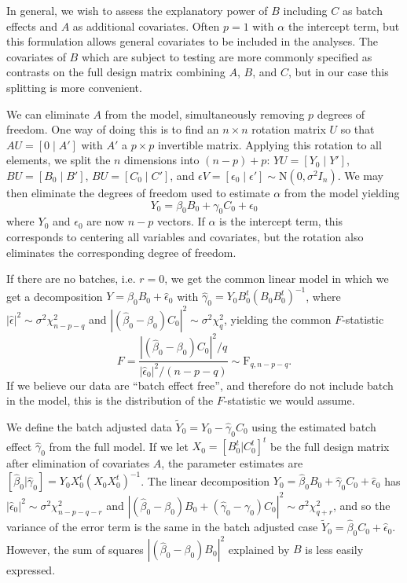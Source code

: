 \documentclass{bio}
\begin{document}
In general, we wish to assess the explanatory power of $B$ including $C$ as batch effects and $A$ as additional covariates. Often $p=1$ with $\alpha$ the intercept term, but this formulation allows general covariates to be included in the analyses. The covariates of $B$ which are subject to testing are more commonly specified as contrasts on the full design matrix combining $A$, $B$, and $C$, but in our case this splitting is more convenient.

We can eliminate $A$ from the model, simultaneously removing $p$ degrees of freedom. One way of doing this is to find an $n\times n$ rotation matrix $U$ so that $AU=[0\mid A']$ with $A'$ a $p\times p$ invertible matrix. Applying this rotation to all elements, we split the $n$ dimensions into $(n-p)+p$:  $YU=[Y_0\mid Y']$, $BU=[B_0\mid B']$, $BU=[C_0\mid C']$, and $\epsilon V=[\epsilon_0\mid\epsilon']\sim\text{N}(0,\sigma^2 I_n)$. We may then eliminate the degrees of freedom used to estimate $\alpha$ from the model yielding
\begin{equation}
Y_0=\beta_0 B_0+\gamma_0 C_0+\epsilon_0
\end{equation}
where $Y_0$ and $\epsilon_0$ are now $n-p$ vectors. If $\alpha$ is the intercept term, this corresponds to centering all variables and covariates, but the rotation also eliminates the corresponding degree of freedom.

If there are no batches, i.e. $r=0$, we get the common linear model in which we get a decomposition $Y=\hat\beta_0B_0+\hat\epsilon_0$ with $\hat\gamma_0=Y_0B_0^t(B_0B_0^t)^{-1}$, where
$|\hat\epsilon|^2\sim\sigma^2\chi^2_{n-p-q}$ and $|(\hat\beta_0-\beta_0)C_0|^2\sim\sigma^2\chi^2_q$, yielding the common
$F$-statistic
\begin{equation}
F=\frac{|(\hat\beta_0-\beta_0)C_0|^2/q}{|\hat\epsilon_0|^2/(n-p-q)}\sim\text{F}_{q,n-p-q}.
\end{equation}
If we believe our data are  ``batch effect free'', and therefore do not include batch in the model, this is the distribution of the $F$-statistic we would assume.

We define the batch adjusted data $\tilde Y_0=Y_0-\hat\gamma_0C_0$ using the estimated batch effect $\hat\gamma_0$ from the full model. If we let $X_0=[B_0^t| C_0^t]^t$ be the full design matrix after elimination of covariates $A$, the parameter estimates are $[\hat\beta_0|\hat\gamma_0]=Y_0X_0^t(X_0X_0^t)^{-1}$. The linear decomposition $Y_0=\hat\beta_0B_0+\hat\gamma_0C_0+\hat\epsilon_0$ has $|\hat\epsilon_0|^2\sim\sigma^2\chi^2_{n-p-q-r}$ and
$|(\hat\beta_0-\beta_0)B_0+(\hat\gamma_0-\gamma_0)C_0|^2\sim\sigma^2\chi^2_{q+r}$, and so the variance of the error term is the same in the batch adjusted case $\tilde Y_0=\hat\beta_0C_0+\hat\epsilon_0$. However, the sum of squares $|(\hat\beta_0-\beta_0)B_0|^2$ explained by $B$ is less easily expressed.
\end{document}
